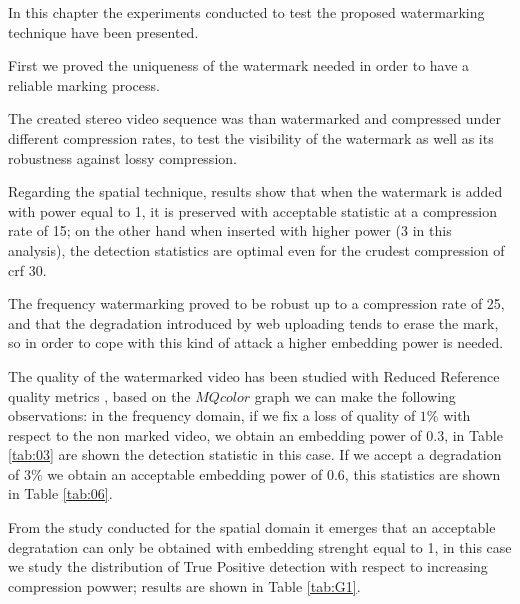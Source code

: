 In this chapter the experiments conducted to test the proposed watermarking technique have been presented.

First we proved the uniqueness of the watermark needed in order to have a reliable marking process.

The created stereo video sequence was than watermarked and compressed under different compression rates, to test the visibility of the watermark as well as its robustness against lossy compression.

Regarding the spatial technique, results show that when the watermark is added with power equal to 1, it is preserved with acceptable statistic at a compression rate of 15; on the other hand when inserted with higher power (3 in this analysis), the detection statistics are optimal even for the crudest compression of crf 30. 

The frequency watermarking proved to be robust up to a compression rate of 25, and that the degradation introduced by web uploading tends to erase the mark, so in order to cope with this kind of attack a higher embedding power is needed.

The quality of the watermarked video has been studied with Reduced Reference quality metrics \cite{QMETRICS}, based on the $MQcolor$ graph we can make the following observations: in the frequency domain, if we fix a loss of quality of $1\%$ with respect to the non marked video, we obtain an embedding power of $0.3$, in Table \ref{tab:03} are shown the detection statistic in this case. If we accept a degradation of $3\%$ we obtain an acceptable embedding power of $0.6$, this statistics are shown in Table  \ref{tab:06}. 

From the study conducted for the spatial domain it emerges that an acceptable degratation can only be obtained with embedding strenght equal to 1, in this case we study the distribution of True Positive detection with respect to increasing compression powwer; results are shown in Table \ref{tab:G1}.


\begin{table}[htbp]
 
 \begin{center}
 \caption{\label{tab:G1}}
 \end{center}
 \end{table}


